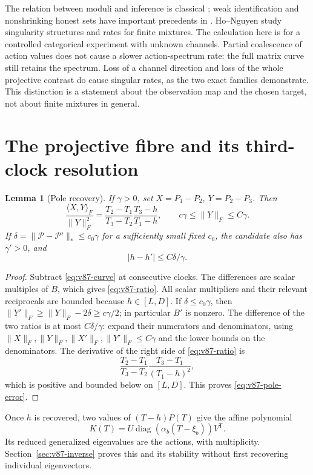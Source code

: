 \documentclass[11pt,reqno]{amsart}
\numberwithin{equation}{section}
\newtheorem{lemma}[theorem]{Lemma}
\theoremstyle{definition}\newtheorem{definition}[theorem]{Definition}
\theoremstyle{remark}\newtheorem{remark}[theorem]{Remark}
\newcommand{\diag}{\operatorname{diag}}
\begin{document}
The relation between moduli and inference is classical
\cite{Donoho,CaiLow}; weak identification and nonshrinking honest
sets have important precedents in \cite{Dufour}. Ho--Nguyen
\cite{HN} study singularity structures and rates for finite mixtures.
The calculation here is for a controlled categorical experiment with
unknown channels. Partial coalescence of action values does not cause
a slower action-spectrum rate: the full matrix curve still retains
the spectrum. Loss of a channel direction and loss of the whole
projective contrast do cause singular rates, as the two exact
families demonstrate. This distinction is a statement about the
observation map and the chosen target, not about finite mixtures in
general.

\section{The projective fibre and its third-clock resolution}
\label{sec:v87-clock}
\begin{lemma}[Pole recovery]\label{lem:v87-pole}
If $\gamma>0$, set $X=P_1-P_2$, $Y=P_2-P_3$. Then
\begin{equation}\label{eq:v87-ratio}
 \frac{\langle X,Y\rangle_F}{\|Y\|_F^2}
 =\frac{T_2-T_1}{T_3-T_2}\frac{T_3-h}{T_1-h},\qquad
 c\gamma\le\|Y\|_F\le C\gamma.
\end{equation}
If $\delta=\|\mathcal P-\mathcal P'\|_*\le c_0\gamma$ for a
sufficiently small fixed $c_0$, the candidate also has $\gamma'>0$,
and
\begin{equation}\label{eq:v87-pole-error}
                         |h-h'|\le C\delta/\gamma.
\end{equation}
\end{lemma}
\begin{proof}
Subtract \eqref{eq:v87-curve} at consecutive clocks. The differences
are scalar multiples of $B$, which gives \eqref{eq:v87-ratio}.
All scalar multipliers and their relevant reciprocals are bounded
because $h\in[L,D]$. If $\delta\le c_0\gamma$, then
$\|Y'\|_F\ge\|Y\|_F-2\delta\ge c\gamma/2$; in particular $B'$
is nonzero. The difference of the two ratios is at most
$C\delta/\gamma$: expand their numerators and denominators, using
$\|X\|_F,\|Y\|_F,\|X'\|_F,\|Y'\|_F\le C\gamma$ and the
lower bounds on the denominators. The derivative of the right side
of \eqref{eq:v87-ratio} is
\[
 \frac{T_2-T_1}{T_3-T_2}\frac{T_3-T_1}{(T_1-h)^2},
\]
which is positive and bounded below on $[L,D]$. This proves
\eqref{eq:v87-pole-error}.
\end{proof}
Once $h$ is recovered, two values of $(T-h)P(T)$ give the affine
polynomial
\begin{equation}\label{eq:v87-cleared}
                  K(T)=U\diag(\alpha_b(T-\xi_b))V^{\mathsf T}.
\end{equation}
Its reduced generalized eigenvalues are the actions, with
multiplicity. Section~\ref{sec:v87-inverse} proves this and its
stability without first recovering individual eigenvectors.
\end{document}

